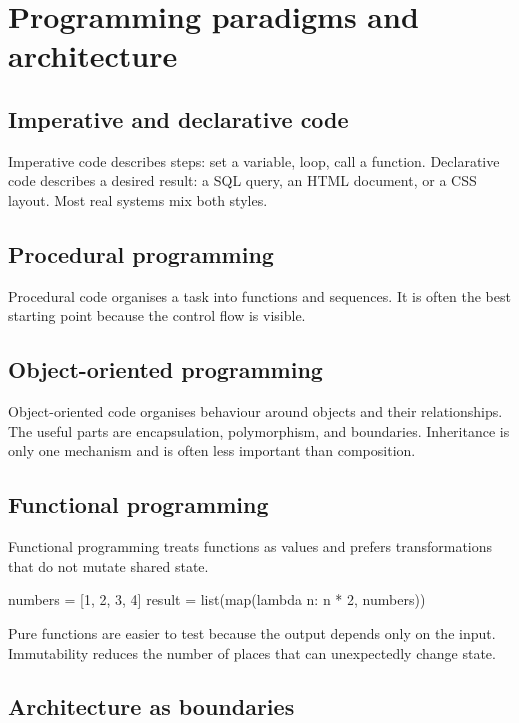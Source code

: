 \documentclass[11pt,openany,oneside]{book}
\begin{document}
\chapter{Programming paradigms and architecture}

\section{Imperative and declarative code}

Imperative code describes steps: set a variable, loop, call a function. Declarative code describes a desired result: a SQL query, an HTML document, or a CSS layout. Most real systems mix both styles.

\section{Procedural programming}

Procedural code organises a task into functions and sequences. It is often the best starting point because the control flow is visible.

\section{Object-oriented programming}

Object-oriented code organises behaviour around objects and their relationships. The useful parts are encapsulation, polymorphism, and boundaries. Inheritance is only one mechanism and is often less important than composition.

\section{Functional programming}

Functional programming treats functions as values and prefers transformations that do not mutate shared state.

\begin{code}[language=Python]
numbers = [1, 2, 3, 4]
result = list(map(lambda n: n * 2, numbers))
\end{code}

Pure functions are easier to test because the output depends only on the input. Immutability reduces the number of places that can unexpectedly change state.

\section{Architecture as boundaries}
\end{document}
